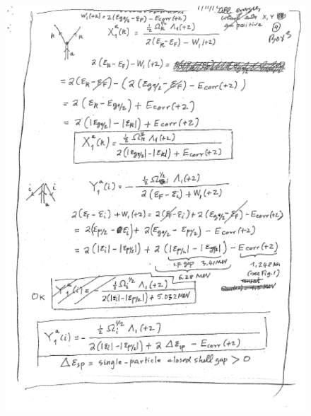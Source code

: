 \documentclass[a4paper,11pt]{book}
\numberwithin{equation}{section}
\numberwithin{figure}{section}
\numberwithin{table}{section}
\begin{document}
\begin{figure}
\centerline{\includegraphics*[width=\textwidth,angle=0]{figs/box3_4.pdf}}
\end{figure}
\end{document}
